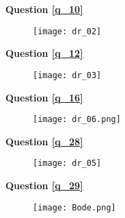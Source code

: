 \newpage


\textbf{Question \ref{q_10}}
\begin{figure}[H]
\centering
\texttt{[image: dr\_02]}
\end{figure}


\textbf{Question \ref{q_12}}

\begin{figure}[H]
\centering
\texttt{[image: dr\_03]}
\end{figure}


\textbf{Question \ref{q_16}}

\begin{figure}[H]
\centering
{\texttt{[image: dr\_06.png]}}
\end{figure}


\newpage

\textbf{Question \ref{q_28}}

\begin{figure}[H]
\centering
\texttt{[image: dr\_05]}
\end{figure}

\vspace{3cm}




\textbf{Question \ref{q_29}}

\begin{figure}[H]
\centering
{\texttt{[image: Bode.png]}}
\end{figure}

\fi
